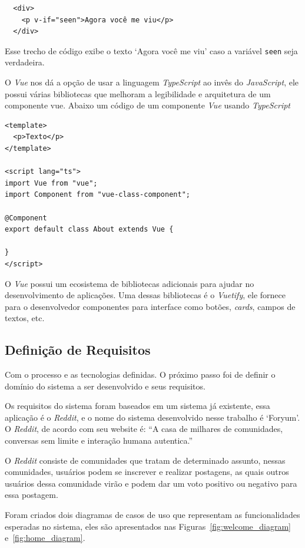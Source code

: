 \documentclass[12pt]{article}
\begin{document}
\begin{verbatim}
  <div>
    <p v-if="seen">Agora você me viu</p>
  </div>
\end{verbatim}

Esse trecho de código exibe o texto `Agora você me viu' caso a variável \verb|seen| seja verdadeira.

O \textit{Vue} nos dá a opção de usar a linguagem \textit{TypeScript} ao invês do \textit{JavaScript}, ele possui
várias bibliotecas que melhoram a legibilidade e arquitetura de um componente vue.
Abaixo um código de um componente \textit{Vue} usando \textit{TypeScript}

\begin{verbatim}
<template>
  <p>Texto</p>
</template>

<script lang="ts">
import Vue from "vue";
import Component from "vue-class-component";

@Component
export default class About extends Vue {

}
</script>
\end{verbatim}

O \textit{Vue} possui um ecosistema de bibliotecas adicionais para ajudar no desenvolvimento de aplicações.
Uma dessas bibliotecas é o \textit{Vuetify}, ele fornece para o desenvolvedor componentes para interface
como botões, \textit{cards}, campos de textos, etc.

\subsection{Definição de Requisitos}

Com o processo e as tecnologias definidas. O próximo passo foi de
definir o domínio do sistema a ser desenvolvido e seus requisitos.

Os requisitos do sistema foram baseados em um sistema já existente, essa aplicação
é o \textit{Reddit}, e o nome do sistema desenvolvido nesse trabalho é `Foryum'. O \textit{Reddit},
de acordo com seu website é: ``A casa de milhares de comunidades, conversas sem
limite e interação humana autentica.''

O \textit{Reddit} consiste de comunidades que tratam de determinado assunto, nessas comunidades, usuários
podem se inscrever e realizar postagens, as quais outros usuários dessa comunidade virão e podem
dar um voto positivo ou negativo para essa postagem.

Foram criados dois diagramas de casos de uso que representam as funcionalidades esperadas no sistema,
eles são apresentados nas Figuras~\ref{fig:welcome_diagram} e~\ref{fig:home_diagram}.
\end{document}
